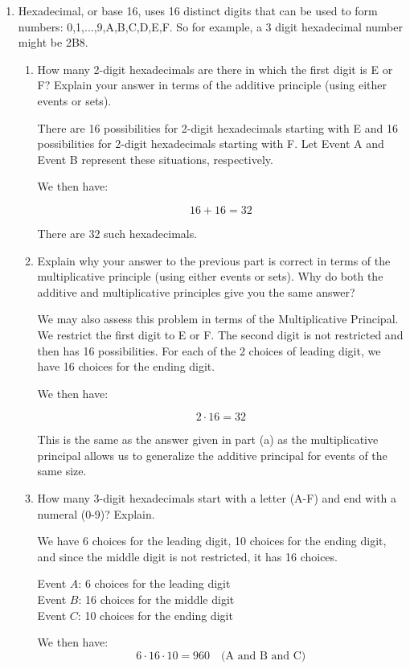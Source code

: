 \documentclass[11pt, letterpaper, includehead]{article}
\theoremstyle{plain}
\theoremstyle{mydefinition}
\theoremstyle{myproperty}
\begin{document}
\begin{enumerate}[label=\textbf{\arabic*}., leftmargin=*]
\item Hexadecimal, or base 16, uses 16 distinct digits that can be used to form numbers: {0,1,...,9,A,B,C,D,E,F}. So for example, a 3 digit hexadecimal number might be 2B8.
\begin{enumerate}[label=(\alph*)]
    \item How many 2-digit hexadecimals are there in which the first digit is E or F? Explain your answer in terms of the additive principle (using either events or sets).

    There are 16 possibilities for 2-digit hexadecimals starting with E and 16 possibilities for 2-digit hexadecimals starting with F. Let Event A and Event B represent these situations, respectively.

    We then have:

    \[
    16 + 16 = 32
    \]

    There are 32 such hexadecimals.
    \item Explain why your answer to the previous part is correct in terms of the multiplicative principle (using either events or sets). Why do both the additive and multiplicative principles give you the same answer?

    We may also assess this problem in terms of the Multiplicative Principal. We restrict the first digit to E or F. The second digit is not restricted and then has 16 possibilities. For each of the 2 choices of leading digit, we have 16 choices for the ending digit.

    We then have:

    \[
    2 \cdot 16 = 32
    \]

    This is the same as the answer given in part (a) as the multiplicative principal allows us to generalize the additive principal for events of the same size.

    \item How many 3-digit hexadecimals start with a letter (A-F) and end with a numeral (0-9)? Explain.
    
    We have 6 choices for the leading digit, 10 choices for the ending digit, and since the middle digit is not restricted, it has 16 choices.

    Event $A$: 6 choices for the leading digit\\
    Event $B$: 16 choices for the middle digit\\
    Event $C$: 10 choices for the ending digit 


    We then have:
    \[
    6 \cdot 16 \cdot 10 = 960 \quad \text{(A and B and C)}
    \]
    

\end{enumerate}
\end{enumerate}
\end{document}
